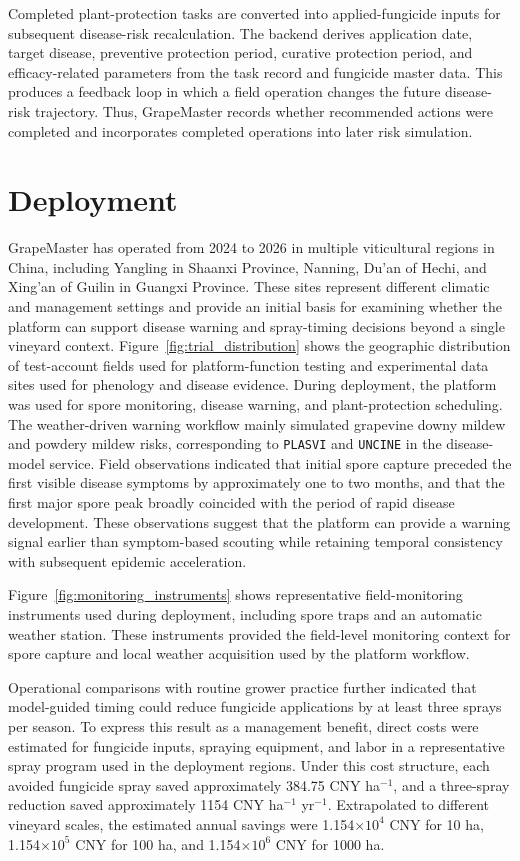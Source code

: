 \documentclass[11pt,a4paper]{article}
\begin{document}
Completed plant-protection tasks are converted into applied-fungicide inputs for subsequent disease-risk recalculation. The backend derives application date, target disease, preventive protection period, curative protection period, and efficacy-related parameters from the task record and fungicide master data. This produces a feedback loop in which a field operation changes the future disease-risk trajectory. Thus, GrapeMaster records whether recommended actions were completed and incorporates completed operations into later risk simulation.

\section{Deployment}

GrapeMaster has operated from 2024 to 2026 in multiple viticultural regions in China, including Yangling in Shaanxi Province, Nanning, Du'an of Hechi, and Xing'an of Guilin in Guangxi Province. These sites represent different climatic and management settings and provide an initial basis for examining whether the platform can support disease warning and spray-timing decisions beyond a single vineyard context. Figure~\ref{fig:trial_distribution} shows the geographic distribution of test-account fields used for platform-function testing and experimental data sites used for phenology and disease evidence. During deployment, the platform was used for spore monitoring, disease warning, and plant-protection scheduling. The weather-driven warning workflow mainly simulated grapevine downy mildew and powdery mildew risks, corresponding to \texttt{PLASVI} and \texttt{UNCINE} in the disease-model service. Field observations indicated that initial spore capture preceded the first visible disease symptoms by approximately one to two months, and that the first major spore peak broadly coincided with the period of rapid disease development. These observations suggest that the platform can provide a warning signal earlier than symptom-based scouting while retaining temporal consistency with subsequent epidemic acceleration.

Figure~\ref{fig:monitoring_instruments} shows representative field-monitoring instruments used during deployment, including spore traps and an automatic weather station. These instruments provided the field-level monitoring context for spore capture and local weather acquisition used by the platform workflow.

Operational comparisons with routine grower practice further indicated that model-guided timing could reduce fungicide applications by at least three sprays per season. To express this result as a management benefit, direct costs were estimated for fungicide inputs, spraying equipment, and labor in a representative spray program used in the deployment regions. Under this cost structure, each avoided fungicide spray saved approximately 384.75 CNY ha$^{-1}$, and a three-spray reduction saved approximately 1154 CNY ha$^{-1}$ yr$^{-1}$. Extrapolated to different vineyard scales, the estimated annual savings were 1.154$\times10^{4}$ CNY for 10 ha, 1.154$\times10^{5}$ CNY for 100 ha, and 1.154$\times10^{6}$ CNY for 1000 ha.
\end{document}

